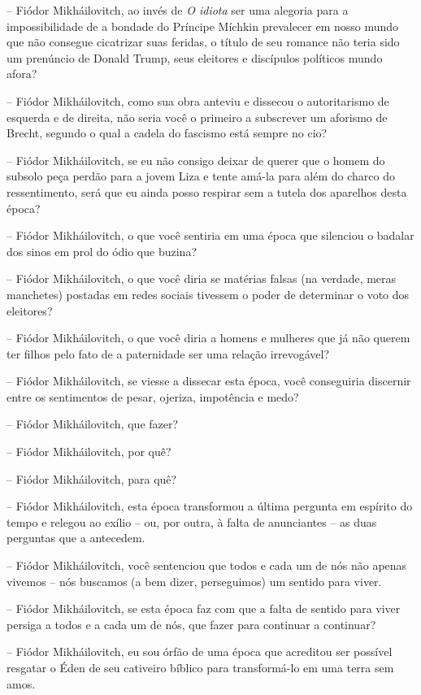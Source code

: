 -- Fiódor Mikháilovitch, ao invés de \emph{O idiota} ser uma alegoria
para a impossibilidade de a bondade do Príncipe Míchkin prevalecer em
nosso mundo que não consegue cicatrizar suas feridas, o título de seu
romance não teria sido um prenúncio de Donald Trump, seus eleitores e
discípulos políticos mundo afora?

-- Fiódor Mikháilovitch, como sua obra anteviu e dissecou o
autoritarismo de esquerda e de direita, não seria você o primeiro a
subscrever um aforismo de Brecht, segundo o qual a cadela do fascismo
está sempre no cio?

-- Fiódor Mikháilovitch, se eu não consigo deixar de querer que o homem
do subsolo peça perdão para a jovem Liza e tente amá-la para além do
charco do ressentimento, será que eu ainda posso respirar sem a tutela
dos aparelhos desta época?

-- Fiódor Mikháilovitch, o que você sentiria em uma época que silenciou
o badalar dos sinos em prol do ódio que buzina?

-- Fiódor Mikháilovitch, o que você diria se matérias falsas (na
verdade, meras manchetes) postadas em redes sociais tivessem o poder de
determinar o voto dos eleitores?

-- Fiódor Mikháilovitch, o que você diria a homens e mulheres que já não
querem ter filhos pelo fato de a paternidade ser uma relação
irrevogável?

-- Fiódor Mikháilovitch, se viesse a dissecar esta época, você
conseguiria discernir entre os sentimentos de pesar, ojeriza, impotência
e medo?

-- Fiódor Mikháilovitch, que fazer?

-- Fiódor Mikháilovitch, por quê?

-- Fiódor Mikháilovitch, para quê?

-- Fiódor Mikháilovitch, esta época transformou a última pergunta em
espírito do tempo e relegou ao exílio -- ou, por outra, à falta de
anunciantes -- as duas perguntas que a antecedem.

-- Fiódor Mikháilovitch, você sentenciou que todos e cada um de nós não
apenas vivemos -- nós buscamos (a bem dizer, perseguimos) um sentido
para viver.

-- Fiódor Mikháilovitch, se esta época faz com que a falta de sentido
para viver persiga a todos e a cada um de nós, que fazer para continuar
a continuar?

-- Fiódor Mikháilovitch, eu sou órfão de uma época que acreditou ser
possível resgatar o Éden de seu cativeiro bíblico para transformá-lo em
uma terra sem amos.

